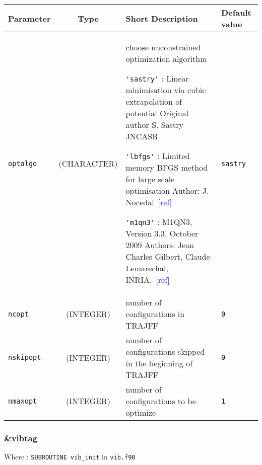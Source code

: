\documentclass[a4paper,8pt]{article}
\newcommand{\addref}{\textcolor{blue}{[ref]}}
\begin{document}
\begin{longtable}{l|c|m{8cm}|m{2cm}}
\hline
\hline
Parameter        &  Type              &          Short Description                                                          & Default value \\
\hline
\hline
\rule[-0.75cm]{0cm}{1.5cm}
\verb?optalgo?   & (CHARACTER)        & \newline choose unconstrained optimization algorithm \newline 

                                        \verb?'sastry'? : Linear minimisation via cubic extrapolation of potential 
					Original author S. Sastry JNCASR \newline

					\verb?'lbfgs'? : Limited memory BFGS method for large scale optimisation
					Author: J. Nocedal~\addref  \newline 
					 
					\verb?'m1qn3'? : M1QN3, Version 3.3, October 2009
					Authors: Jean Charles Gilbert, Claude Lemarechal, INRIA.~\addref \newline            & \verb?sastry? \tabularnewline
\hline
\rule[-0.75cm]{0cm}{1.5cm}
\verb?ncopt?     & (INTEGER)          & number of configurations in TRAJFF                                                   & \verb?0? \\
\hline
\rule[-0.75cm]{0cm}{1.5cm}
\verb?nskipopt?  & (INTEGER)          & number of configurations skipped in the beginning of TRAJFF                          & \verb?0? \\
\hline
\rule[-0.75cm]{0cm}{1.5cm}
\verb?nmaxopt?   & (INTEGER)          & number of configurations to be optimize                                              & \verb?1? \\
\hline
\hline
\end{longtable}

\subsubsection{\&vibtag}

Where : \verb?SUBROUTINE vib_init? in \verb?vib.f90?
\newline
\end{document}
